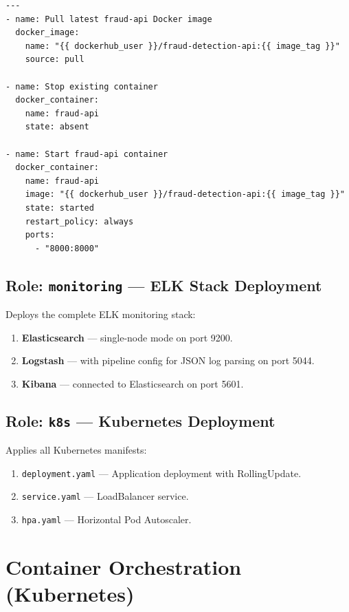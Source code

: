 \documentclass[12pt,a4paper]{article}
\begin{document}
\begin{lstlisting}[language={},caption={Role: app/main.yml}]
---
- name: Pull latest fraud-api Docker image
  docker_image:
    name: "{{ dockerhub_user }}/fraud-detection-api:{{ image_tag }}"
    source: pull

- name: Stop existing container
  docker_container:
    name: fraud-api
    state: absent

- name: Start fraud-api container
  docker_container:
    name: fraud-api
    image: "{{ dockerhub_user }}/fraud-detection-api:{{ image_tag }}"
    state: started
    restart_policy: always
    ports:
      - "8000:8000"
\end{lstlisting}

\subsection{Role: \texttt{monitoring} --- ELK Stack Deployment}

Deploys the complete ELK monitoring stack:

\begin{enumerate}
    \item \textbf{Elasticsearch} --- single-node mode on port 9200.
    \item \textbf{Logstash} --- with pipeline config for JSON log parsing on port 5044.
    \item \textbf{Kibana} --- connected to Elasticsearch on port 5601.
\end{enumerate}

\subsection{Role: \texttt{k8s} --- Kubernetes Deployment}

Applies all Kubernetes manifests:

\begin{enumerate}
    \item \texttt{deployment.yaml} --- Application deployment with RollingUpdate.
    \item \texttt{service.yaml} --- LoadBalancer service.
    \item \texttt{hpa.yaml} --- Horizontal Pod Autoscaler.
\end{enumerate}

\section{Container Orchestration (Kubernetes)}
\end{document}
